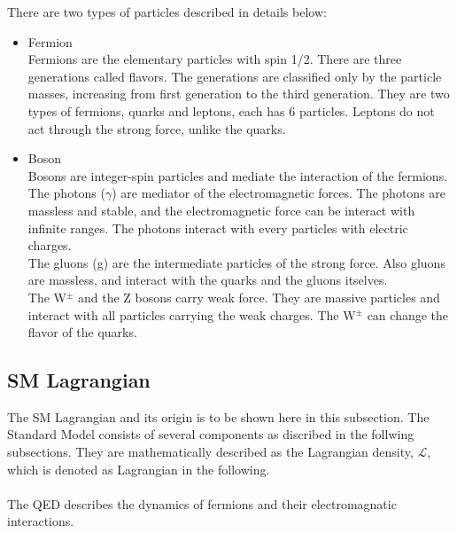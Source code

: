 There are two types of particles described in details below:
\begin{itemize}
    \item Fermion \\
    Fermions are the elementary particles with spin 1/2. There are three generations called flavors. The generations are classified only by the particle masses, increasing from first generation to the third generation. They are two types of fermions, quarks and leptons, each has 6 particles. Leptons do not act through the strong force, unlike the quarks.
    \item Boson \\
    Bosons are integer-spin particles and mediate the interaction of the fermions.
    The photons ($\gamma$) are mediator of the electromagnetic forces. The photons are massless and stable, and the electromagnetic force can be interact with infinite ranges. The photons interact with every particles with electric charges.\\
    The gluons (g) are the intermediate particles of the strong force. Also gluons are massless, and interact with the quarks and the gluons itselves.\\
    The W$^\pm$ and the Z bosons carry weak force. They are massive particles and interact with all particles carrying the weak charges. The W$^\pm$ can change the flavor of the quarks. \\
\end{itemize}

\subsection{SM Lagrangian}
The SM Lagrangian and its origin is to be shown here in this subsection. 
The Standard Model consists of several components as discribed in the follwing subsections. They are mathematically described as the Lagrangian density, $\mathcal{L}$, which is denoted as Lagrangian in the following.\\

\noindent\textbf{} \\ 
The QED describes the dynamics of fermions and their electromagnatic interactions.

